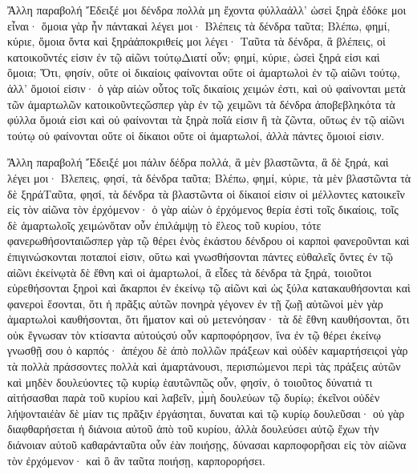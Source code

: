 Ἄλλη παραβολή 
Ἔδειξέ μοι δένδρα πολλὰ μη ἔχοντα φύλλαἀλλ’ ὡσεὶ ξηρὰ ἐδόκε μοι εἶναι· ὅμοια γὰρ ἦν πάντακαὶ λέγει μοι· Βλέπεις τὰ δένδρα ταῦτα; Βλέπω, φημί, κύριε, ὅμοια ὄντα καὶ ξηράἀποκριθείς μοι λέγει· Ταῦτα τὰ δένδρα, ἃ βλέπεις, οἱ κατοικοῦντές εἰσιν ἐν τῷ αἰῶνι τούτῳΔιατί οὖν; φημί, κύριε, ὡσεὶ ξηρά εἰσι καὶ ὅμοια; Ὅτι, φησίν, οὔτε οἱ δικαίοις φαίνονται οὔτε οἱ ἁμαρτωλοὶ ἐν τῷ αἰῶνι τούτῳ, ἀλλ’ ὅμοιοί εἰσιν· ὁ γὰρ αἰὼν οὗτος τοῖς δικαίοις χειμών ἐστι, καὶ οὐ φαίνονται μετὰ τῶν ἁμαρτωλῶν κατοικοῦντεςὥσπερ γὰρ ἐν τῷ χειμῶνι τὰ δένδρα ἀποβεβληκότα τὰ φύλλα ὅμοιά εἰσι καὶ οὐ φαίνονται τὰ ξηρὰ ποῖά εἰσιν ἢ τὰ ζῶντα, οὕτως ἐν τῷ αἰῶνι τούτῳ οὐ φαίνονται οὔτε οἱ δίκαιοι οὔτε οἱ ἁμαρτωλοί, ἀλλὰ πάντες ὅμοιοί εἰσιν.

Ἄλλη παραβολή 
Ἔδειξέ μοι πάλιν δέδρα πολλά, ἃ μὲν βλαστῶντα, ἃ δὲ ξηρά, καὶ λέγει μοι· Βλεπεις, φησί, τὰ δένδρα ταῦτα; Βλέπω, φημί, κύριε, τὰ μὲν βλαστῶντα τὰ δὲ ξηράΤαῦτα, φησί, τὰ δένδρα τὰ βλαστῶντα οἱ δίκαιοί εἰσιν οἱ μέλλοντες κατοικεῖν εἰς τὸν αἰῶνα τὸν ἐρχόμενον· ὁ γὰρ αἰὼν ὁ ἐρχόμενος θερία ἐστὶ τοῖς δικαίοις, τοῖς δὲ ἁμαρτωλοῖς χειμώνὅταν οὖν ἐπιλάμψῃ τὸ ἔλεος τοῦ κυρίου, τότε φανερωθήσονταιὥσπερ γὰρ τῷ θέρει ἑνὸς ἑκάστου δένδρου οἱ καρποὶ φανεροῦνται καὶ ἐπιγινώσκονται ποταποί εἰσιν, οὕτω καὶ γνωσθήσονται πάντες εὐθαλεῖς ὄντες ἐν τῷ αἰῶνι ἐκείνῳτὰ δὲ ἔθνη καὶ οἱ ἁμαρτωλοί, ἃ εἶδες τὰ δένδρα τὰ ξηρά, τοιοῦτοι εὑρεθήσονται ξηροὶ καὶ ἄκαρποι ἐν ἐκείνῳ τῷ αἰῶνι καὶ ὡς ξύλα κατακαυθήσονται καὶ φανεροὶ ἔσονται, ὅτι ἡ πρᾶξις αὐτῶν πονηρὰ γέγονεν ἐν τῇ ζωῇ αὐτῶνοἱ μὲν γὰρ ἁμαρτωλοὶ καυθήσονται, ὅτι ἥματον καὶ οὐ μετενόησαν· τὰ δὲ ἔθνη καυθήσονται, ὅτι οὐκ ἔγνωσαν τὸν κτίσαντα αὐτούςσύ οὖν καρποφόρησον, ἵνα ἐν τῷ θέρει ἐκείνῳ γνωσθῇ σου ὁ καρπός· ἀπέχου δὲ ἀπὸ πολλῶν πράξεων καὶ οὐδὲν καμαρτήσειςοἱ γὰρ τὰ πολλὰ πράσσοντες πολλὰ καὶ ἁμαρτάνουσι, περισπώμενοι περὶ τὰς πράξεις αὐτῶν καὶ μηδὲν δουλεύοντες τῷ κυρίῳ ἑαυτῶνπῶς οὖν, φησίν, ὁ τοιοῦτος δύνατιά τι αἰτήσασθαι παρὰ τοῦ κυρίου καὶ λαβεῖν, μ̀μὴ δουλεύων τῷ δυρίῳ; ἐκεῖνοι οὐδὲν λήψονταιἐὰν δὲ μίαν τις πρᾶξιν ἐργάσηται, δυναται καὶ τῷ κυρίῳ δουλεῦσαι· οὐ γὰρ διαφθαρήσεται ἡ διάνοια αὐτοῦ ἀπὸ τοῦ κυρίου, ἀλλὰ δουλεύσει αὐτῷ ἔχων τὴν διάνοιαν αὐτοῦ καθαράνταῦτα οὖν ἐὰν ποιήσῃς, δύνασαι καρποφορῆσαι εἰς τὸν αἰῶνα τὸν ἐρχόμενον· καὶ ὃ ἂν ταῦτα ποιήσῃ, καρπορορήσει.

